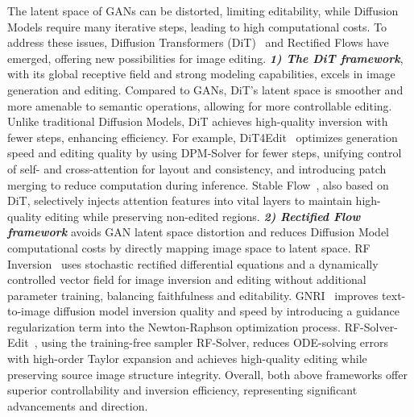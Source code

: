 The latent space of GANs can be distorted, limiting editability, while Diffusion Models require many iterative steps, leading to high computational costs. To address these issues, Diffusion Transformers (DiT)~\cite{DiT} and Rectified Flows have emerged, offering new possibilities for image editing. 
\textbf{\textit{1) The DiT framework}}, with its global receptive field and strong modeling capabilities, excels in image generation and editing. Compared to GANs, DiT's latent space is smoother and more amenable to semantic operations, allowing for more controllable editing. Unlike traditional Diffusion Models, DiT achieves high-quality inversion with fewer steps, enhancing efficiency. For example, DiT4Edit~\cite{DiT4Edit} optimizes generation speed and editing quality by using DPM-Solver for fewer steps, unifying control of self- and cross-attention for layout and consistency, and introducing patch merging to reduce computation during inference. Stable Flow~\cite{Stable}, also based on DiT, selectively injects attention features into vital layers to maintain high-quality editing while preserving non-edited regions. 
\textbf{\textit{2) Rectified Flow framework}} avoids GAN latent space distortion and reduces Diffusion Model computational costs by directly mapping image space to latent space. RF Inversion~\cite{RFInversion} uses stochastic rectified differential equations and a dynamically controlled vector field for image inversion and editing without additional parameter training, balancing faithfulness and editability. GNRI~\cite{GNRI} improves text-to-image diffusion model inversion quality and speed by introducing a guidance regularization term into the Newton-Raphson optimization process. RF-Solver-Edit~\cite{RF-Solver-Edit}, using the training-free sampler RF-Solver, reduces ODE-solving errors with high-order Taylor expansion and achieves high-quality editing while preserving source image structure integrity. 
Overall, both above frameworks offer superior controllability and inversion efficiency, representing significant advancements and direction.

